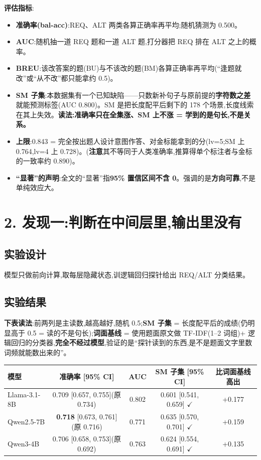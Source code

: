 \documentclass[fontset=none,10.5pt]{ctexart}
\newcommand{\ok}{\textcolor{okgreen}{\ensuremath{\checkmark}}}
\begin{document}
\textbf{评估指标}:

\begin{itemize}
\item \textbf{准确率(bal-acc)}:REQ、ALT 两类各算正确率再平均;随机猜测为 0.500。
\item \textbf{AUC}:随机抽一道 REQ 题和一道 ALT 题,打分器把 REQ 排在 ALT 之上的概率。
\item \textbf{BREU}:该改答案的题(BU)与不该改的题(BM)各算正确率再平均(``逢题就改''或``从不改''都只能拿约 0.5)。
\item \textbf{SM 子集}:本数据集有一个已知缺陷——只数新补句子与原前提的\textbf{字符数之差}就能预测标签(AUC 0.800)。SM 是把长度配平后剩下的 178 个场景,长度线索在其上失效。\textbf{读法:准确率只在全集涨、SM 上不涨 = 学到的是句长,不是关系。}
\item \textbf{上限}:0.843 = 完全按出题人设计意图作答、对金标能拿到的分(lv=5;SM 上 0.764,lv=4 上 0.728)。(\textbf{注意}其不等同于人类准确率,推算得单个标注者与金标的一致率约 0.890)。
\item \textbf{``显著''的声明}:全文的``显著''指\textbf{95\% 置信区间不含 0}。强调的是\textbf{方向可靠},不是单纯效应大。
\end{itemize}

\section*{2. 发现一:判断在中间层里,输出里没有}

\subsection*{实验设计}

模型只做前向计算,取每层隐藏状态,训逻辑回归探针给出 REQ/ALT 分类结果。

\subsection*{实验结果}

\begin{notice}
\textbf{下表读法}:前两列是主读数,越高越好,随机 0.5;\textbf{SM 子集} = 长度配平后的成绩(仍明显高于 0.5 = 读的不是句长);\textbf{词面基线} = 使用题面原文做 TF-IDF(1--2 词组)+ 逻辑回归的分类器,\textbf{完全不经过模型},验证的是``探针读到的东西,是不是题面文字里数词频就能数出来的''。
\end{notice}

\begin{center}\small
\begin{tabular}{lcccc}
\toprule
\rowcolor{tabhead}
模型 & 准确率 [95\% CI] & AUC & SM 子集 [95\% CI] & 比词面基线高出\\
\midrule
Llama-3.1-8B & 0.709 [0.657, 0.755](原 0.734) & 0.802 & 0.601 [0.541, 0.659] \ok & +0.177\\
Qwen2.5-7B & \textbf{0.718} [0.673, 0.761](原 0.716) & 0.771 & 0.635 [0.570, 0.701] \ok & +0.159\\
Qwen3-4B & 0.706 [0.658, 0.753](原 0.692) & 0.763 & 0.624 [0.554, 0.691] \ok & +0.135\\
\bottomrule
\end{tabular}
\end{center}
\end{document}
